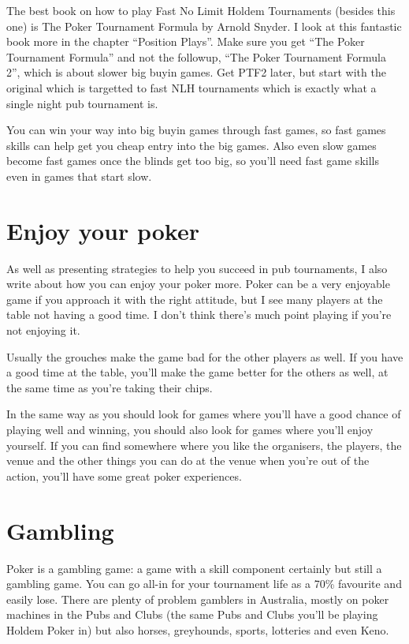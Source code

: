 The best book on how to play Fast No Limit Holdem Tournaments
(besides this one) is The Poker Tournament Formula by Arnold Snyder.
I look at this fantastic book more in the chapter ``Position Plays''.
Make sure you get ``The Poker Tournament Formula'' and not the followup,
``The Poker Tournament Formula 2'', which is about slower big buyin games.
Get PTF2 later, but start with the original which is targetted to fast
NLH tournaments which is exactly what a single night pub tournament is.

You can win your way into big buyin games through fast games,
so fast games skills can help get you cheap entry into the big games.
Also even slow games become fast games once the blinds get too big,
so you'll need fast game skills even in games that start slow.

\section*{Enjoy your poker}

As well as presenting strategies to help you succeed
in pub tournaments,
I also write about how you can enjoy your poker
more. Poker can be a very enjoyable game if you approach
it with the right attitude, but I see many players at the table
not having a good time. I don't think there's much
point playing if you're not enjoying it.

Usually the grouches make the game bad for the other
players as well. If you have a good time at the table, you'll make the
game better for the others as well, at the same time as you're taking
their chips.

In the same way as you should look for games where you'll have
a good chance of playing well and winning, you should
also look for games where you'll enjoy yourself.
If you can find somewhere where you like
the organisers, the players, the venue and the other things
you can do at the venue when you're out of the action,
you'll have some great poker experiences.

\section*{Gambling}

Poker is a gambling
game: a game with a skill component certainly but still
a gambling game. You can go all-in for your tournament life
as a 70\% favourite and easily lose. There are plenty of problem gamblers
in Australia, mostly on poker machines in the Pubs and Clubs
(the same Pubs and Clubs you'll be playing Holdem Poker
in) but also horses, greyhounds, sports, lotteries and even Keno.

